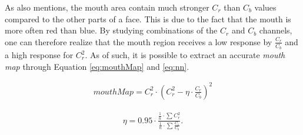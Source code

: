 
 As \cite{fdInColorImages} also mentions, the mouth area contain much stronger $C_{r}$ than $C_{b}$ values compared to the other parts of a face. This is due to the fact that the mouth is more often red than blue. By studying combinations of the $C_{r}$ and $C_{b}$ channels, one can therefore realize that the mouth region receives a low response by $\frac{C_{r}}{C_{b}}$ and a high response for $C_{r}^2$. As of such, it is possible to extract an accurate \textit{mouth map} through Equation \ref{eq:mouthMap} and \ref{eq:nn}.


\begin{equation} \label{eq:mouthMap}
\begin{split}
mouthMap = C_r^2 \cdot (C_r^2 - \eta \cdot \frac{C_r}{C_b})^2
\end{split}
\end{equation}

\begin{equation} \label{eq:nn}
\begin{split}
\eta = 0.95 \cdot \frac{\frac{1}{n} \cdot \sum\limits_{} C_r^2}{\frac{1}{n} \cdot \sum\limits_{} \frac{C_r}{C_b}}.
\end{split}
\end{equation}







